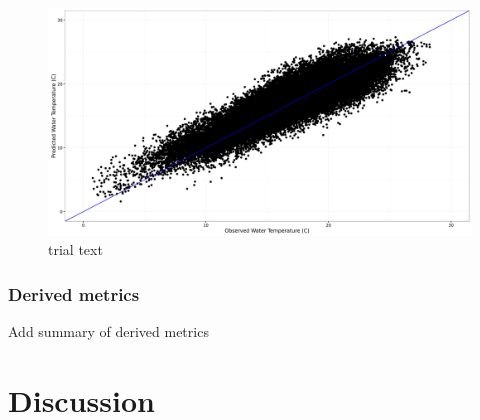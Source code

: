 \documentclass[]{article}
\begin{document}
\begin{figure}[htbp]
\centering
\includegraphics{Figures/validation_plot.jpg}
\caption{trial text}
\end{figure}

\subsubsection{Derived metrics}\label{derived-metrics-1}

Add summary of derived metrics

\section{Discussion}\label{discussion}
\end{document}
